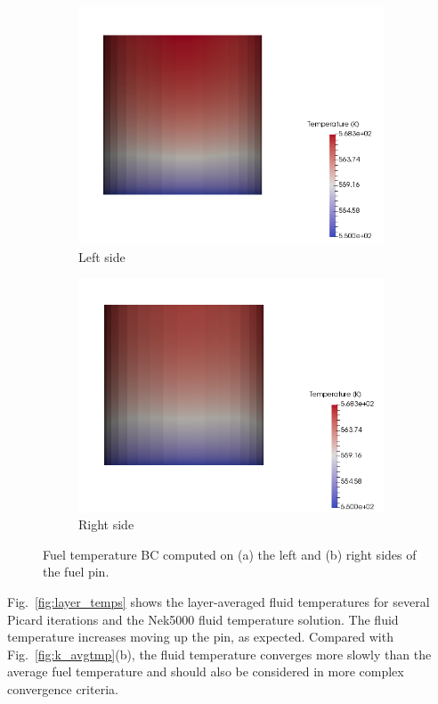 \documentclass[letterpaper]{physor2018}
\begin{document}
\begin{figure}[!htb]
\centering
\begin{subfigure}{.5\textwidth}
  \centering
  \includegraphics[width=0.8\linewidth]{../Figures/temp_left.png}
  \caption{Left side}
\end{subfigure}%
\begin{subfigure}{.5\textwidth}
  \centering
  \includegraphics[width=0.8\linewidth]{../Figures/temp_right.png}
  \caption{Right side}
\end{subfigure}
\caption{Fuel temperature BC computed
on (a) the left and (b) right sides of the fuel pin.}
\label{fig:fuel_temps}
\end{figure}

Fig.~\ref{fig:layer_temps} shows the layer-averaged fluid temperatures
for several Picard iterations and the Nek5000 fluid temperature solution.
The fluid temperature increases moving up the pin,
as expected. Compared with Fig.~\ref{fig:k_avgtmp}(b), the fluid temperature
converges more slowly than the average fuel temperature and should also
be considered in more complex convergence criteria.
\end{document}
